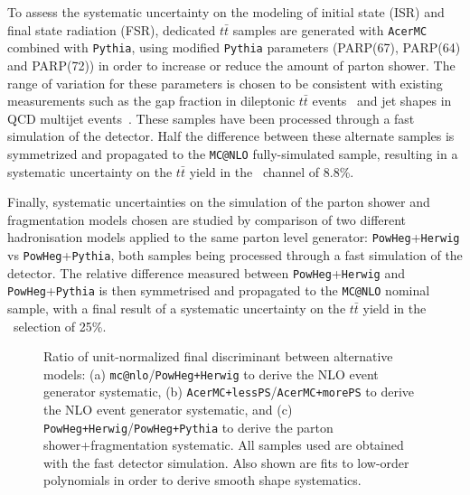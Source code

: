 To assess the systematic uncertainty on the modeling of 
initial state (ISR) and final state radiation (FSR), dedicated
$t\bar{t}$ samples are generated with \texttt{AcerMC}
combined with \texttt{Pythia}, using modified \texttt{Pythia} parameters 
(PARP(67), PARP(64) and PARP(72)) 
in order to increase or reduce the amount of parton shower. 
The range of variation for these parameters is chosen to be 
consistent with existing measurements such as the gap fraction in dileptonic 
$t\bar{t}$ events~\cite{ttjet} and jet shapes in QCD multijet events~\cite{morelessPS}.  
These samples have been processed through a fast simulation
of the detector. Half the difference between these alternate samples is symmetrized 
and propagated to the \texttt{MC@NLO} fully-simulated sample, resulting in a
systematic uncertainty on the $t\bar{t}$ yield in the \tight\ channel of 8.8\%.

Finally, systematic uncertainties on the simulation 
of the parton shower and fragmentation models chosen 
are studied by comparison of two different hadronisation 
models applied to the same parton level generator: 
\texttt{PowHeg}+\texttt{Herwig} vs \texttt{PowHeg}+\texttt{Pythia}, 
both samples being processed through a fast simulation of the detector.
The relative difference measured between 
\texttt{PowHeg}+\texttt{Herwig} and \texttt{PowHeg}+\texttt{Pythia} is 
then symmetrised and propagated to the 
\texttt{MC@NLO} nominal sample, with a final
result of a systematic uncertainty on the 
$t\bar{t}$ yield in the \tight\ selection of 25\%. 

\begin{figure}[htb]\begin{center}
	\caption{Ratio of unit-normalized final discriminant between alternative models:
(a) \texttt{mc@nlo}/\texttt{PowHeg+Herwig}  to derive the NLO event generator systematic,
(b) \texttt{AcerMC+lessPS}/\texttt{AcerMC+morePS}  to derive the NLO event generator systematic, and
(c) \texttt{PowHeg+Herwig}/\texttt{PowHeg+Pythia}  to derive the parton shower+fragmentation systematic.
All samples used are obtained with the fast detector simulation.
Also shown are fits to low-order polynomials in order to derive smooth shape systematics.
\label{fig:ttbarmodel_ratios}}
\end{center}\end{figure}


